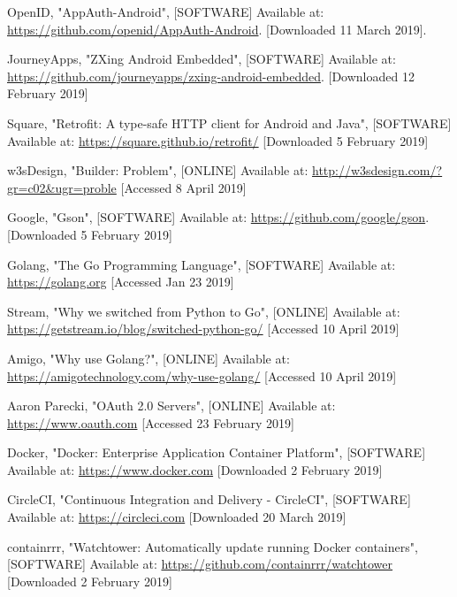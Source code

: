 \documentclass[onecolumn]{IEEEtran}
\begin{document}
{\begin{thebibliography}{10}
     OpenID,
     "AppAuth-Android",
     [SOFTWARE] Available at: 
     \url{https://github.com/openid/AppAuth-Android}. [Downloaded 11 March 2019].
     
     JourneyApps,
     "ZXing Android Embedded",
     [SOFTWARE] Available at:
     \url{https://github.com/journeyapps/zxing-android-embedded}.
     [Downloaded 12 February 2019]
     
     Square,
     "Retrofit: A type-safe HTTP client for Android and Java",
     [SOFTWARE] Available at:
     \url{https://square.github.io/retrofit/}
     [Downloaded 5 February 2019]
     
     w3sDesign,
     "Builder: Problem",
     [ONLINE] Available at:
     \url{http://w3sdesign.com/?gr=c02&ugr=proble}
     [Accessed 8 April 2019]
     
     Google,
     "Gson",
     [SOFTWARE] Available at:
     \url{https://github.com/google/gson}.
     [Downloaded 5 February 2019]
     
     Golang,
     "The Go Programming Language",
     [SOFTWARE] Available at:
     \url{https://golang.org}
     [Accessed Jan 23 2019]
     
     Stream,
     "Why we switched from Python to Go",
     [ONLINE] Available at:
     \url{https://getstream.io/blog/switched-python-go/}
     [Accessed 10 April 2019]
     
     Amigo,
     "Why use Golang?",
     [ONLINE] Available at:
     \url{https://amigotechnology.com/why-use-golang/}
     [Accessed 10 April 2019]
     
     Aaron Parecki,
     "OAuth 2.0 Servers",
     [ONLINE] Available at:
     \url{https://www.oauth.com}
     [Accessed 23 February 2019]
     
     Docker,
     "Docker: Enterprise Application Container Platform",
     [SOFTWARE] Available at:
     \url{https://www.docker.com}
     [Downloaded 2 February 2019]
     
     CircleCI,
     "Continuous Integration and Delivery - CircleCI",
     [SOFTWARE] Available at:
     \url{https://circleci.com}
     [Downloaded 20 March 2019]
     
     containrrr,
     "Watchtower: Automatically update running Docker containers",
     [SOFTWARE] Available at:
     \url{https://github.com/containrrr/watchtower}
     [Downloaded 2 February 2019]
   

\end{thebibliography}}
\end{document}
